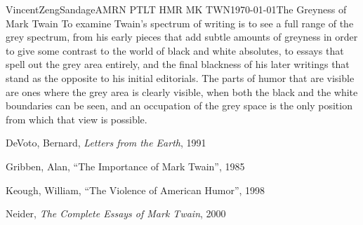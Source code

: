 \documentclass{article}[12pt]
\begin{document}
\begin{mla}{Vincent}{Zeng}{Sandage}{AMRN PTLT HMR MK TWN}{\today}{The Greyness of Mark Twain}
To examine Twain's spectrum of writing is to see a full range of the grey spectrum, from his early pieces that add subtle amounts of greyness in order to give some contrast to the world of black and white absolutes, to essays that spell out the grey area entirely, and the final blackness of his later writings that stand as the opposite to his initial editorials. The parts of humor that are visible are ones where the grey area is clearly visible, when both the black and the white boundaries can be seen, and an occupation of the grey space is the only position from which that view is possible.
\begin{workscited}

	\bibindent 
	DeVoto, Bernard, \textit{Letters from the Earth}, 1991

	\bibindent 
	Gribben, Alan, ``The Importance of Mark Twain'', 1985
	
	\bibindent 
	Keough, William, ``The Violence of American Humor'', 1998
	
	\bibindent 
	Neider, \textit{The Complete Essays of Mark Twain}, 2000
	
\end{workscited}
\end{mla}
\end{document}
